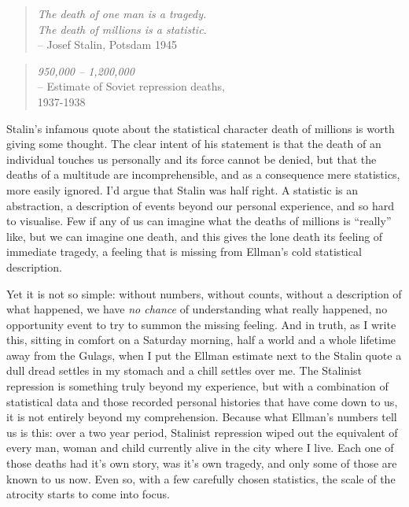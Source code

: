 \begin{quote}
{\it The death of one man is a tragedy.\\  The death of millions is a statistic.}\\
\hspace*{2cm} -- Josef Stalin, Potsdam 1945
\end{quote}

\begin{quote}
{\it 950,000 -- 1,200,000} \\
\hspace*{2cm} -- Estimate of Soviet repression deaths, \\ \hspace*{2.3cm} 1937-1938 \cite{Ellman2002}
\end{quote}


Stalin's infamous quote about the statistical character death of millions is worth giving some thought. The clear intent of his statement is that the death of an individual touches us personally and its force cannot be denied, but that the deaths of a multitude are incomprehensible, and as a consequence mere statistics, more easily ignored. I'd argue that Stalin was half right. A statistic is an abstraction, a description of events beyond our personal experience, and so hard to visualise. Few if any of us can imagine what the deaths of millions is ``really'' like, but we can imagine one death, and this gives the lone death its feeling of immediate tragedy, a feeling that is missing from Ellman's cold statistical description.

Yet it is not so simple: without numbers, without counts, without a description of what happened, we have {\it no chance} of understanding what really happened, no opportunity event to try to summon the missing feeling. And in truth, as I write this, sitting in comfort on a Saturday morning, half a world and a whole lifetime away from the Gulags, when I put the Ellman estimate next to the Stalin quote a dull dread settles in my stomach and a chill settles over me. The Stalinist repression is something truly beyond my experience, but with a combination of statistical data and those recorded personal histories that have come down to us, it is not entirely beyond my comprehension. Because what Ellman's numbers tell us is this: over a two year period, Stalinist repression wiped out the equivalent of every man, woman and child currently alive in the city where I live. Each one of those deaths had it's own story, was it's own tragedy, and only some of those are known to us now. Even so, with a few carefully chosen statistics, the scale of the atrocity starts to come into focus.  

